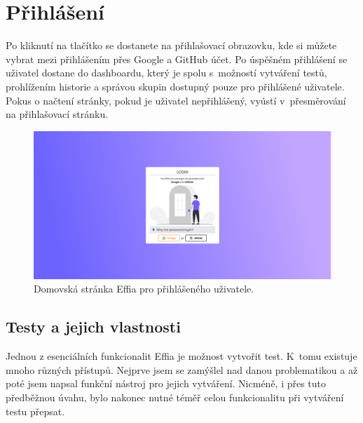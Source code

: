 \documentclass[12pt, a4paper,
openright
]{report}
\begin{document}

\section{Přihlášení}
Po kliknutí na tlačítko  se dostanete na přihlašovací obrazovku, kde si můžete vybrat mezi přihlášením přes Google a GitHub účet. Po úspěšném přihlášení se uživatel dostane do dashboardu, který je spolu s~možností vytváření testů, prohlížením historie a správou skupin dostupný pouze pro přihlášené uživatele. Pokus o načtení stránky, pokud je uživatel nepřihlášený, vyústí v~přesměrování na přihlašovací stránku.

\begin{figure}[h]
	\centering %
	\includegraphics[width=1\linewidth]{image/login.png} 
	\caption{Domovská stránka Effia pro přihlášeného uživatele.} %
	\label{fig:homepage-loggedin} %
\end{figure}

\subsection{Testy a jejich vlastnosti}
Jednou z esenciálních funkcionalit Effia je možnost vytvořit test. K~tomu existuje mnoho různých přístupů. Nejprve jsem se zamýšlel nad danou problematikou a až poté jsem napsal funkční nástroj pro jejich vytváření. Nicméně, i přes tuto předběžnou úvahu, bylo nakonec nutné téměř celou funkcionalitu při vytváření testu přepsat.
\end{document}
